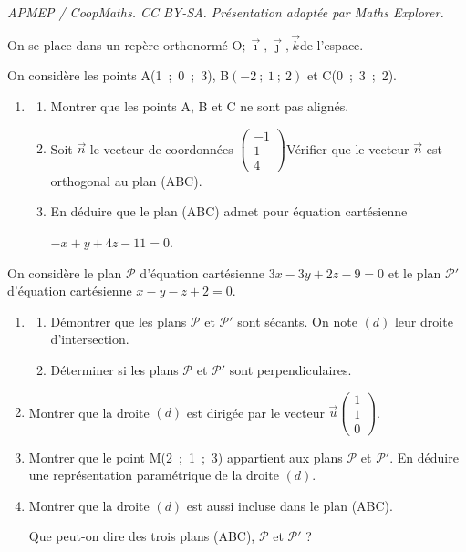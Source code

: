 \documentclass[10pt]{article}
\providecommand{\vect}[1]{\overrightarrow{#1}}
\providecommand{\Oijk}{\(\mathrm{O};\vec{\imath},\vec{\jmath},\vec{k}\)}
\begin{document}
\noindent\textit{APMEP / CoopMaths. CC BY-SA. Présentation adaptée par Maths Explorer.}\par\medskip
On se place dans un repère orthonormé \Oijk de l'espace.

On considère les points A(1~;~0~;~3), B$( -2~;~1~;~2)$ et C(0~;~3~;~2).

\medskip

\begin{enumerate}
\item 
	\begin{enumerate}
		\item Montrer que les points A, B et C ne sont pas alignés.
		\item Soit $\vect{n}$ le vecteur de coordonnées $\begin{pmatrix}-1\\1\\4\end{pmatrix}$Vérifier que le vecteur $\vect{n}$ est orthogonal au plan (ABC).
		\item En déduire que le plan (ABC) admet pour équation cartésienne 

$-x + y + 4z - 11 = 0$.
	\end{enumerate}
\end{enumerate}

On considère le plan $\mathcal{P}$ d'équation cartésienne $3x - 3y + 2z - 9 = 0$ et le plan $\mathcal{P}'$ d'équation cartésienne $x - y- z + 2 = 0$.

\begin{enumerate}[resume]
\item 
	\begin{enumerate}
		\item Démontrer que les plans $\mathcal{P}$ et $\mathcal{P}'$ sont sécants. On note $(d)$ leur droite d'intersection.
		\item Déterminer si les plans $\mathcal{P}$ et $\mathcal{P}'$ sont perpendiculaires.
	\end{enumerate}
\item Montrer que la droite $(d)$ est dirigée par le vecteur $\vect{u}\begin{pmatrix}1\\1\\0\end{pmatrix}$.
\item Montrer que le point M(2~;~1~;~3) appartient aux plans $\mathcal{P}$ et $\mathcal{P}'$. En déduire une représentation paramétrique de la droite $(d)$.
\item Montrer que la droite $(d)$ est aussi incluse dans le plan (ABC).

Que peut-on dire des trois plans (ABC), $\mathcal{P}$ et $\mathcal{P}'$ ?
\end{enumerate}
\end{document}
